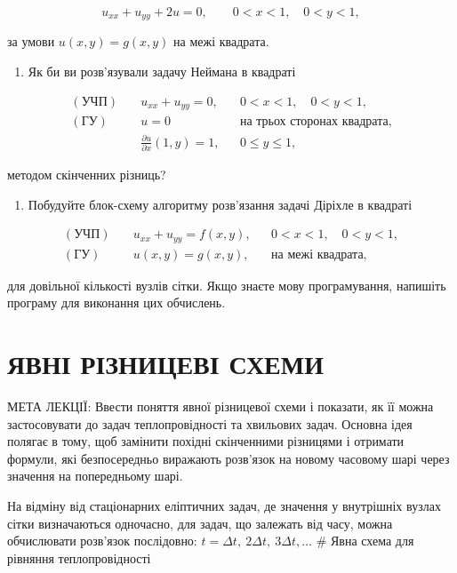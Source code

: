 \documentclass[
  ukrainian,
]{article}
\providecommand{\tightlist}{%
  \setlength{\itemsep}{0pt}\setlength{\parskip}{0pt}}
\begin{document}
\[
u_{xx}+u_{yy}+2u=0,\qquad 0<x<1,\quad 0<y<1,
\]

за умови \(u(x,y)=g(x,y)\) на межі квадрата.

\begin{enumerate}
\def\labelenumi{\arabic{enumi}.}
\setcounter{enumi}{4}
\tightlist
\item
  Як би ви розв'язували задачу Неймана в квадраті
\end{enumerate}

\[
\begin{aligned}
(\text{УЧП})\quad & u_{xx}+u_{yy}=0, && 0<x<1,\quad 0<y<1,\\
(\text{ГУ})\quad & u=0 && \text{на трьох сторонах квадрата},\\
& \frac{\partial u}{\partial x}(1,y)=1, && 0\le y\le 1,
\end{aligned}
\]

методом скінченних різниць?

\begin{enumerate}
\def\labelenumi{\arabic{enumi}.}
\setcounter{enumi}{5}
\tightlist
\item
  Побудуйте блок-схему алгоритму розв'язання задачі Діріхле в квадраті
\end{enumerate}

\[
\begin{aligned}
(\text{УЧП})\quad & u_{xx}+u_{yy}=f(x,y), && 0<x<1,\quad 0<y<1,\\
(\text{ГУ})\quad & u(x,y)=g(x,y), && \text{на межі квадрата},
\end{aligned}
\]

для довільної кількості вузлів сітки. Якщо знаєте мову програмування,
напишіть програму для виконання цих обчислень.

\section{ЯВНІ РІЗНИЦЕВІ
СХЕМИ}\label{ux44fux432ux43dux456-ux440ux456ux437ux43dux438ux446ux435ux432ux456-ux441ux445ux435ux43cux438}

МЕТА ЛЕКЦІЇ: Ввести поняття явної різницевої схеми і показати, як її
можна застосовувати до задач теплопровідності та хвильових задач.
Основна ідея полягає в тому, щоб замінити похідні скінченними різницями
і отримати формули, які безпосередньо виражають розв'язок на новому
часовому шарі через значення на попередньому шарі.

На відміну від стаціонарних еліптичних задач, де значення у внутрішніх
вузлах сітки визначаються одночасно, для задач, що залежать від часу,
можна обчислювати розв'язок послідовно:
\(t=\Delta t,\ 2\Delta t,\ 3\Delta t,\dots\) \# Явна схема для рівняння
теплопровідності
\end{document}
